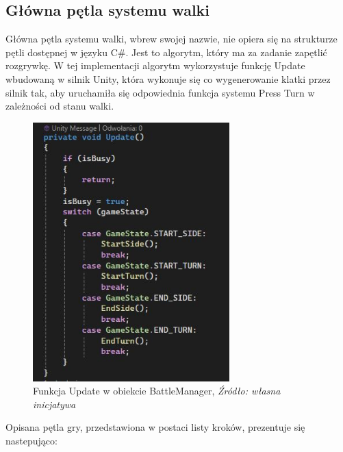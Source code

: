 \documentclass{SGGW-thesis}
\begin{document}
\subsection{Główna pętla systemu walki}
Główna pętla systemu walki, wbrew swojej nazwie, nie opiera się na strukturze pętli dostępnej w języku C\#. Jest to algorytm, który ma za zadanie zapętlić rozgrywkę.
W tej implementacji algorytm wykorzystuje funkcję Update wbudowaną w silnik Unity, która wykonuje się co wygenerowanie klatki przez silnik tak, aby uruchamiła się odpowiednia funkcja systemu Press Turn w zależności od stanu walki.
\begin{figure}[H]
  \centering
  \includegraphics[height=10cm]{updatebattle.JPG}
  \caption{Funkcja Update w obiekcie BattleManager, \textit{Źródło: własna inicjatywa}}
\end{figure}
\pagebreak
Opisana pętla gry, przedstawiona w postaci listy kroków, prezentuje się nastepująco:
\end{document}
